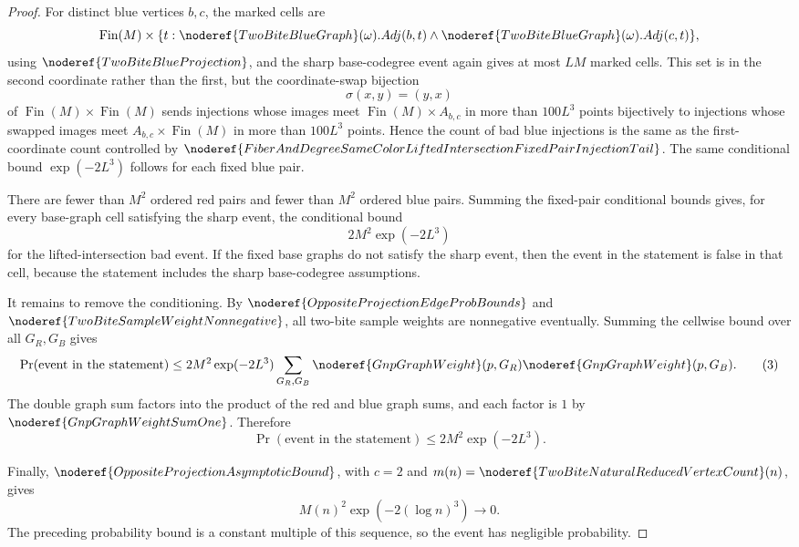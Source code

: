 \begin{proof}
For distinct blue vertices \(b,c\), the marked cells are
\[
\operatorname{Fin}(M)\times
\{t:\noderef{TwoBiteBlueGraph}(\omega).Adj(b,t)\land
\noderef{TwoBiteBlueGraph}(\omega).Adj(c,t)\},
\]
using \(\noderef{TwoBiteBlueProjection}\), and the sharp base-codegree event
again gives at most \(LM\) marked cells.  This set is in the second coordinate
rather than the first, but the coordinate-swap bijection
\[
\sigma(x,y)=(y,x)
\]
of \(\operatorname{Fin}(M)\times\operatorname{Fin}(M)\) sends injections whose
images meet \(\operatorname{Fin}(M)\times A_{b,c}\) in more than \(100L^3\)
points bijectively to injections whose swapped images meet
\(A_{b,c}\times\operatorname{Fin}(M)\) in more than \(100L^3\) points.  Hence
the count of bad blue injections is the same as the first-coordinate count
controlled by
\(\noderef{FiberAndDegreeSameColorLiftedIntersectionFixedPairInjectionTail}\).
The same conditional bound \(\exp(-2L^3)\) follows for each fixed blue pair.

There are fewer than \(M^2\) ordered red pairs and fewer than \(M^2\) ordered
blue pairs.  Summing the fixed-pair conditional bounds gives, for every
base-graph cell satisfying the sharp event, the conditional bound
\[
2M^2\exp(-2L^3)
\]
for the lifted-intersection bad event.  If the fixed base graphs do not
satisfy the sharp event, then the event in the statement is false in that
cell, because the statement includes the sharp base-codegree assumptions.

It remains to remove the conditioning.  By
\(\noderef{OppositeProjectionEdgeProbBounds}\) and
\(\noderef{TwoBiteSampleWeightNonnegative}\), all two-bite sample weights are
nonnegative eventually.  Summing the cellwise bound over all \(G_R,G_B\) gives
\[
\Pr(\text{event in the statement})
\le
2M^2\exp(-2L^3)
\sum_{G_R,G_B}
\noderef{GnpGraphWeight}(p,G_R)\noderef{GnpGraphWeight}(p,G_B).
\tag{3}
\]
The double graph sum factors into the product of the red and blue graph sums,
and each factor is \(1\) by \(\noderef{GnpGraphWeightSumOne}\).  Therefore
\[
\Pr(\text{event in the statement})\le 2M^2\exp(-2L^3).
\tag{4}
\]

Finally, \(\noderef{OppositeProjectionAsymptoticBound}\), with \(c=2\) and
\(m(n)=\noderef{TwoBiteNaturalReducedVertexCount}(n)\), gives
\[
M(n)^2\exp(-2(\log n)^3)\to0.
\]
The preceding probability bound is a constant multiple of this sequence, so
the event has negligible probability.
\end{proof}
